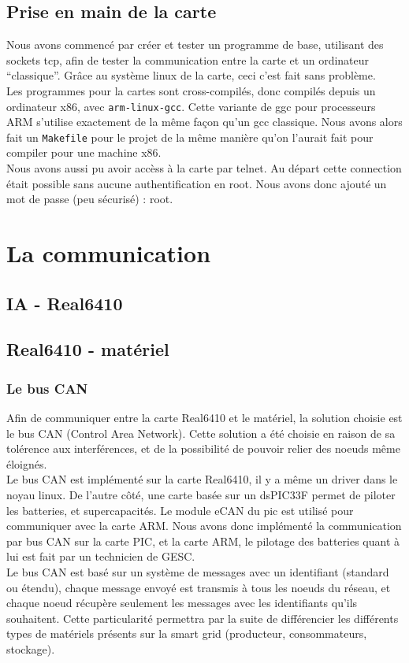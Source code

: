 \documentclass[a4,french,12pt]{article}
\begin{document}
\subsection{Prise en main de la carte}
Nous avons commencé par créer et tester un programme de base, utilisant des sockets tcp, afin de tester la communication entre 
la carte et un ordinateur ``classique''. Grâce au système linux de la carte, ceci c'est fait sans problème. \\
Les programmes pour la cartes sont cross-compilés, donc compilés depuis un ordinateur x86, avec \texttt{arm-linux-gcc}. Cette 
variante de ggc pour processeurs ARM s'utilise exactement de la même façon qu'un gcc classique. Nous avons alors fait un 
\texttt{Makefile} pour le projet de la même manière qu'on l'aurait fait pour compiler pour une machine x86. \\
Nous avons aussi pu avoir accèss à la carte par telnet. Au départ cette connection était possible sans aucune authentification 
en root. Nous avons donc ajouté un mot de passe (peu sécurisé) : root.

\newpage
\section{La communication}
\subsection{IA - Real6410}

\subsection{Real6410 - matériel}
\subsubsection{Le bus CAN}
Afin de communiquer entre la carte Real6410 et le matériel, la solution choisie est le bus CAN (Control Area Network). Cette 
solution a été choisie en raison de sa tolérence aux interférences, et de la possibilité de pouvoir relier des noeuds même 
éloignés. \\
Le bus CAN est implémenté sur la carte Real6410, il y a même un driver dans le noyau linux. De l'autre côté, une carte 
basée sur un dsPIC33F permet de piloter les batteries, et supercapacités. Le module eCAN du pic est utilisé pour 
communiquer avec la carte ARM. Nous avons donc implémenté la communication par bus CAN sur la carte PIC, et la carte ARM, 
le pilotage des batteries quant à lui est fait par un technicien de GESC. \\
Le bus CAN est basé sur un système de messages avec un identifiant (standard ou étendu), chaque message envoyé est transmis 
à tous les noeuds du réseau, et chaque noeud récupère seulement les messages avec les identifiants qu'ils souhaitent. Cette 
particularité permettra par la suite de différencier les différents types de matériels présents sur la smart grid 
(producteur, consommateurs, stockage).
\end{document}
